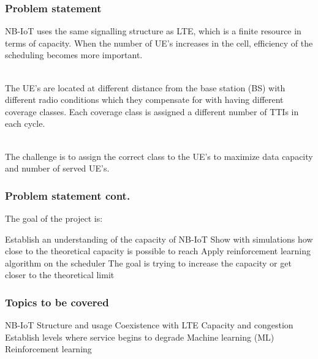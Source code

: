 \documentclass[aspectratio=43,t]{beamer}
\begin{document}
%
%


\begin{frame}
\frametitle{Problem statement}


NB-IoT uses the same signalling structure as LTE, which is a finite resource in terms of capacity. When the number of UE's increases in the cell, efficiency of the scheduling becomes more important.

~\\

The UE's are located at different distance from the base station (BS) with different radio conditions which they compensate for with having different coverage classes. Each coverage class is assigned a different number of TTIs in each cycle.

~\\

The challenge is to assign the correct class to the UE's to maximize data capacity and number of served UE's.

\end{frame}


\begin{frame}
\frametitle{Problem statement \small{cont.}}

The goal of the project is:

\begin{outline}
\1 Establish an understanding of the capacity of NB-IoT
  \2 Show with simulations how close to the theoretical capacity is possible to reach
\1 Apply reinforcement learning algorithm on the scheduler
  \2 The goal is trying to increase the capacity or get closer to the theoretical limit
\end{outline}

\end{frame}


\begin{frame}
\frametitle{Topics to be covered}

\begin{outline}
\1 NB-IoT
  \2 Structure and usage
  \2 Coexistence with LTE
\1 Capacity and congestion
  \2 Establish levels where service begins to degrade
\1 Machine learning (ML)
  \2 Reinforcement learning
\end{outline}

\end{frame}
\end{document}
